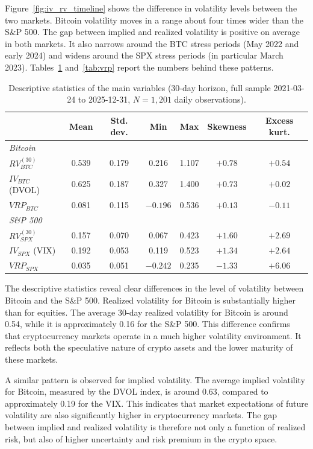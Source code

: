 \documentclass[11pt,a4paper,openany]{report}
\begin{document}
Figure~\ref{fig:iv_rv_timeline} shows the difference in volatility
levels between the two markets. Bitcoin volatility moves in a range
about four times wider than the S\&P 500. The gap between implied and
realized volatility is positive on average in both markets. It also
narrows around the BTC stress periods (May 2022 and early 2024) and
widens around the SPX stress periods (in particular March 2023).
Tables~\ref{tab:desc} and~\ref{tab:vrp} report the numbers behind
these patterns.


\begin{table}[H]
\centering
\caption{Descriptive statistics of the main variables (30-day horizon, full sample 2021-03-24 to 2025-12-31, $N=1{,}201$ daily observations).}
\label{tab:desc}
\small
\begin{tabular}{lcccccc}
\toprule
& Mean & Std. dev. & Min & Max & Skewness & Excess kurt. \\
\midrule
\multicolumn{7}{l}{\textit{Bitcoin}} \\
\quad $RV^{(30)}_{BTC}$  & 0.539 & 0.179 & 0.216 & 1.107 & $+0.78$ & $+0.54$ \\
\quad $IV_{BTC}$ (DVOL)  & 0.625 & 0.187 & 0.327 & 1.400 & $+0.73$ & $+0.02$ \\
\quad $VRP_{BTC}$        & 0.081 & 0.115 & $-0.196$ & 0.536 & $+0.13$ & $-0.11$ \\[2pt]
\multicolumn{7}{l}{\textit{S\&P 500}} \\
\quad $RV^{(30)}_{SPX}$  & 0.157 & 0.070 & 0.067 & 0.423 & $+1.60$ & $+2.69$ \\
\quad $IV_{SPX}$ (VIX)   & 0.192 & 0.053 & 0.119 & 0.523 & $+1.34$ & $+2.64$ \\
\quad $VRP_{SPX}$        & 0.035 & 0.051 & $-0.242$ & 0.235 & $-1.33$ & $+6.06$ \\
\bottomrule
\end{tabular}
\end{table}

The descriptive statistics reveal clear differences in the level of
volatility between Bitcoin and the S\&P 500. Realized volatility for
Bitcoin is substantially higher than for equities. The average 30-day
realized volatility for Bitcoin is around 0.54, while it is
approximately 0.16 for the S\&P 500. This difference confirms that
cryptocurrency markets operate in a much higher volatility environment.
It reflects both the speculative nature of crypto assets and the lower
maturity of these markets.

A similar pattern is observed for implied volatility. The average
implied volatility for Bitcoin, measured by the DVOL index, is around
0.63, compared to approximately 0.19 for the VIX. This indicates that
market expectations of future volatility are also significantly higher
in cryptocurrency markets. The gap between implied and realized
volatility is therefore not only a function of realized risk, but also
of higher uncertainty and risk premium in the crypto space.
\end{document}
